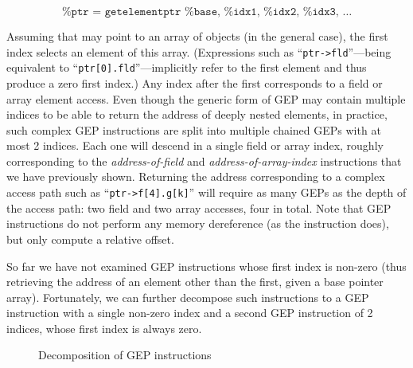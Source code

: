 \[
  \texttt{
  }
  \ldots
\]

Assuming that  may point to an array of objects (in the
general case), the first index selects an element of this
array. (Expressions such as ``\texttt{ptr->fld}''---being
equivalent to ``\texttt{ptr[0].fld}''---implicitly refer to
the first element and thus produce a zero first index.)
%
Any index after the first corresponds to a field or array element
access.
Even
though the generic form of GEP may contain multiple indices to be able
to return the address of deeply nested elements, in practice, such
complex GEP instructions are split into multiple chained GEPs with at
most 2 indices.
%
Each one will descend in a single field or array index, roughly
corresponding to the \emph{address-of-field} and
\emph{address-of-array-index} instructions that we have previously
shown. Returning the address corresponding to a complex access path
such as ``\texttt{ptr->f[4].g[k]}'' will require as many GEPs
as the depth of the access path: two field and two array accesses,
four in total.
%
Note that GEP instructions do not perform any memory dereference (as
the  instruction does), but only compute a relative
offset.

So far we have not examined GEP instructions whose first index is
non-zero (thus retrieving the address of an element other than the
first, given a base pointer array). Fortunately, we can further
decompose such instructions to a GEP instruction with a single
non-zero index and a second GEP instruction of 2 indices, whose first
index is always zero.

\begin{figure}[h!t]
  \centering
  \begin{minipage}[b]{.4\linewidth}
    \centering
    \begin{bitcode}
    \end{bitcode}
    \label{structsens/fig/gep1}
  \end{minipage}%
  \qquad
  \begin{minipage}[b]{.4\linewidth}
    \centering
    \begin{bitcode}
    \end{bitcode}
    \label{structsens/fig/gep2}\par\vfill
  \end{minipage}
  \caption{Decomposition of GEP instructions}
  \label{structsens/fig/gep}
\end{figure}

